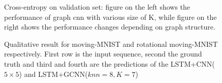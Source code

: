 \documentclass{article} %
\begin{document}
\begin{figure}[ht]
	\centering
	\hfill
	\caption{Cross-entropy on validation set: figure on the left shows the performance of graph cnn with various size of K, while figure on the right shows the performance changes depending on graph structure.}
	\label{mMNIST_graph}
\end{figure}

\begin{figure}[ht]
	\centering
	\vfill
	\caption{Qualitative result for moving-MNIST and rotational moving-MNIST respectively. First row is the input sequence, second the ground truth and third and fourth are the predictions of the LSTM+CNN($5\times5$) and LSTM+GCNN($knn=8, K=7$)}
	\label{mMNIST_img}
\end{figure}
\end{document}
